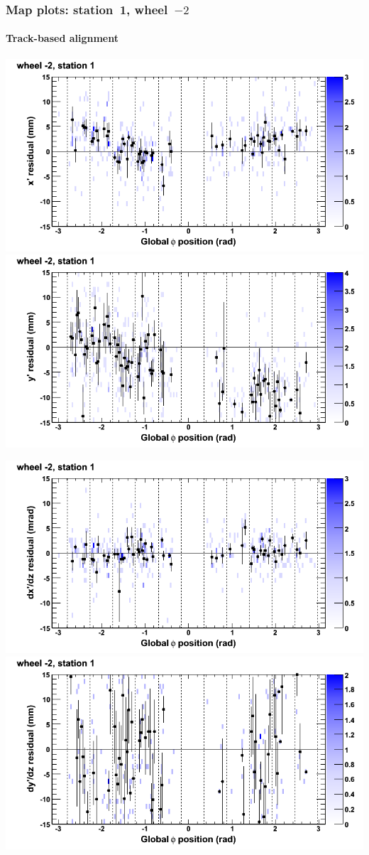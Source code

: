 \documentclass[compress]{beamer}
\begin{document}
\begin{frame}
\frametitle{Map plots: station~1, wheel~$-2$}
\framesubtitle{Track-based alignment}
\includegraphics[width=0.5\linewidth]{mapplots_re05/DTvsphi_st1whA_x.png}
\includegraphics[width=0.5\linewidth]{mapplots_re05/DTvsphi_st1whA_y.png}

\includegraphics[width=0.5\linewidth]{mapplots_re05/DTvsphi_st1whA_dxdz.png}
\includegraphics[width=0.5\linewidth]{mapplots_re05/DTvsphi_st1whA_dydz.png}
\end{frame}
\end{document}
